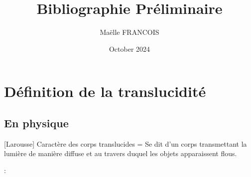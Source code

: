 \documentclass{report}
\title{Bibliographie Préliminaire}
\author{Maëlle FRANCOIS}
\date{October 2024}
\begin{document}
\maketitle

\section{Définition de la translucidité}
\subsection{En physique}

[Larousse] Caractère des corps translucides = Se dit d'un corps transmettant la lumière de manière diffuse et au travers duquel les objets apparaissent flous. \newline


\cite{gigilashvili_translucency_2021} : 



 

\end{document}
